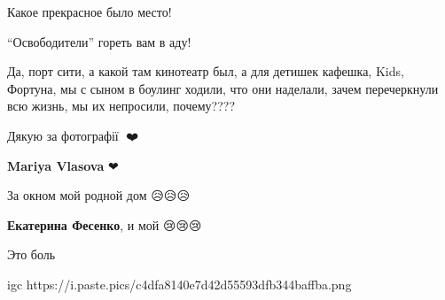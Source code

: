 
Какое прекрасное было место!

\enquote{Освободители} гореть вам в аду!


Да, порт сити, а какой там кинотеатр был, а для детишек кафешка, Kids, Фортуна,
мы с сыном в боулинг ходили, что они наделали, зачем перечеркнули всю жизнь, мы
их непросили, почему????


Дякую за фотографії 🙏❤️

\textbf{Mariya Vlasova} ❤


За окном мой родной дом 😥😥😥

\textbf{Екатерина Фесенко}, и мой 😢😢😢


Это боль

\ifcmt
  igc https://i.paste.pics/c4dfa8140e7d42d55593dfb344baffba.png
\fi
